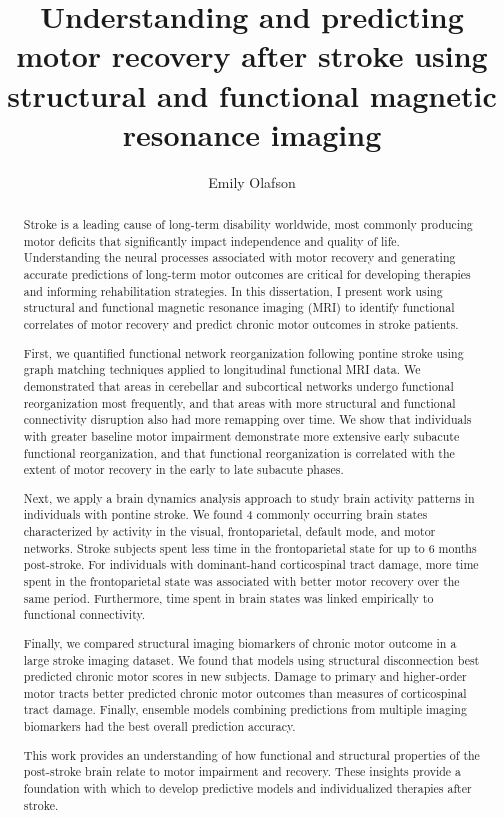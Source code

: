 \documentclass[phd,tocprelim]{cornell}
\title {Understanding and predicting motor recovery after stroke using structural and functional magnetic resonance imaging}
\author {Emily Olafson}
\begin{document}
\maketitle
\makecopyright

\begin{abstract}

Stroke is a leading cause of long-term disability worldwide, most commonly producing motor deficits that significantly impact independence and quality of life. Understanding the neural processes associated with motor recovery and generating accurate predictions of long-term motor outcomes are critical for developing therapies and informing rehabilitation strategies. In this dissertation, I present work using structural and functional magnetic resonance imaging (MRI) to identify functional correlates of motor recovery and predict chronic motor outcomes in stroke patients. 

First, we quantified functional network reorganization following pontine stroke using graph matching techniques applied to longitudinal functional MRI data. We demonstrated that areas in cerebellar and subcortical networks undergo functional reorganization most frequently, and that areas with more structural and functional connectivity disruption also had more remapping over time. We show that individuals with greater baseline motor impairment demonstrate more extensive early subacute functional reorganization, and that functional reorganization is correlated with the extent of motor recovery in the early to late subacute phases.

Next, we apply a brain dynamics analysis approach to study brain activity patterns in individuals with pontine stroke. We found 4 commonly occurring brain states characterized by activity in the visual, frontoparietal, default mode, and motor networks. Stroke subjects spent less time in the frontoparietal state for up to 6 months post-stroke. For individuals with dominant-hand corticospinal tract damage, more time spent in the frontoparietal state was associated with better motor recovery over the same period. Furthermore, time spent in brain states was linked empirically to functional connectivity.

Finally, we compared structural imaging biomarkers of chronic motor outcome in a large stroke imaging dataset. We found that models using structural disconnection best predicted chronic motor scores in new subjects. Damage to primary and higher-order motor tracts better predicted chronic motor outcomes than measures of corticospinal tract damage. Finally, ensemble models combining predictions from multiple imaging biomarkers had the best overall prediction accuracy.

This work provides an understanding of how functional and structural properties of the post-stroke brain relate to motor impairment and recovery. These insights provide a foundation with which to develop predictive models and individualized therapies after stroke.

\end{abstract}
\end{document}
